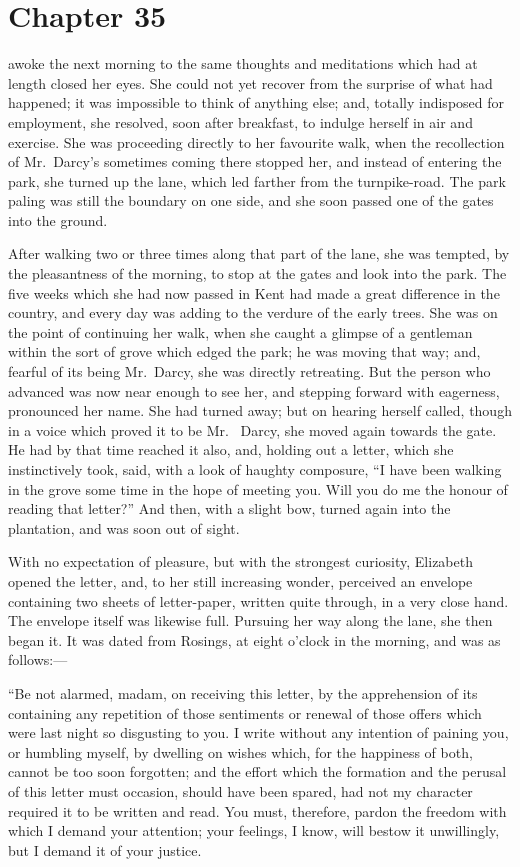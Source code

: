 \chapter{Chapter 35}


 awoke the next morning to the same thoughts and
meditations which had at length closed her eyes.  She could
not yet recover from the surprise of what had happened; it was
impossible to think of anything else; and, totally indisposed
for employment, she resolved, soon after breakfast, to indulge
herself in air and exercise.  She was proceeding directly to her
favourite walk, when the recollection of Mr.\ Darcy's sometimes
coming there stopped her, and instead of entering the park, she
turned up the lane, which led farther from the turnpike-road.
The park paling was still the boundary on one side, and she
soon passed one of the gates into the ground.

After walking two or three times along that part of the lane, she
was tempted, by the pleasantness of the morning, to stop at the
gates and look into the park.  The five weeks which she had now
passed in Kent had made a great difference in the country, and
every day was adding to the verdure of the early trees.  She was
on the point of continuing her walk, when she caught a glimpse
of a gentleman within the sort of grove which edged the park;
he was moving that way; and, fearful of its being Mr.\ Darcy,
she was directly retreating.  But the person who advanced was
now near enough to see her, and stepping forward with eagerness,
pronounced her name.  She had turned away; but on hearing
herself called, though in a voice which proved it to be Mr.\ %
Darcy, she moved again towards the gate.  He had by that time
reached it also, and, holding out a letter, which she instinctively
took, said, with a look of haughty composure, ``I have been
walking in the grove some time in the hope of meeting you.  Will
you do me the honour of reading that letter?''  And then, with a
slight bow, turned again into the plantation, and was soon out of
sight.

With no expectation of pleasure, but with the strongest curiosity,
Elizabeth opened the letter, and, to her still increasing wonder,
perceived an envelope containing two sheets of letter-paper,
written quite through, in a very close hand.  The envelope itself
was likewise full.  Pursuing her way along the lane, she then
began it.  It was dated from Rosings, at eight o'clock in the
morning, and was as follows:---

\bigskip
``Be not alarmed, madam, on receiving this letter, by the
apprehension of its containing any repetition of those sentiments
or renewal of those offers which were last night so disgusting to
you.  I write without any intention of paining you, or humbling
myself, by dwelling on wishes which, for the happiness of both,
cannot be too soon forgotten; and the effort which the formation
and the perusal of this letter must occasion, should have been
spared, had not my character required it to be written and read.
You must, therefore, pardon the freedom with which I demand
your attention; your feelings, I know, will bestow it unwillingly,
but I demand it of your justice.


